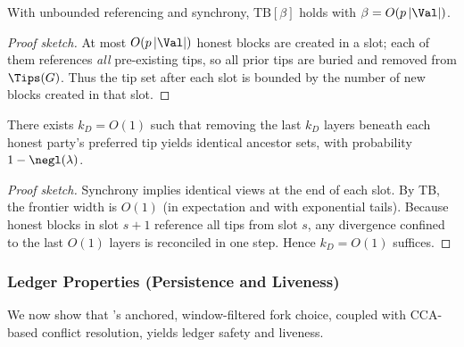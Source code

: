 {\begin{theorem}
\label{thm:ideal-TB}
With unbounded referencing and synchrony, $\mathrm{TB}[\beta]$ holds with $\beta=O(p\,|\Val|)$.
\end{theorem}
\begin{proof}[Proof sketch]
At most $O(p\,|\Val|)$ honest blocks are created in a slot; each of them references \emph{all} pre-existing tips, so all prior tips are buried and removed from $\Tips(G)$. Thus the tip set after each slot is bounded by the number of new blocks created in that slot.
\end{proof}

\begin{theorem}
\label{thm:ideal-DCP}
There exists $k_D=O(1)$ such that removing the last $k_D$ layers beneath each honest party's preferred tip yields identical ancestor sets, with probability $1-\negl(\lambda)$.
\end{theorem}
\begin{proof}[Proof sketch]
Synchrony implies identical views at the end of each slot. By TB, the frontier width is $O(1)$ (in expectation and with exponential tails). Because honest blocks in slot $s{+}1$ reference all tips from slot $s$, any divergence confined to the last $O(1)$ layers is reconciled in one step. Hence $k_D=O(1)$ suffices.
\end{proof}

\subsubsection{Ledger Properties (Persistence and Liveness)}
\label{subsec:ideal-ledger-props}
We now show that \ProjIdeal's anchored, window-filtered fork choice, coupled with CCA-based conflict resolution, yields ledger safety and liveness.

}
